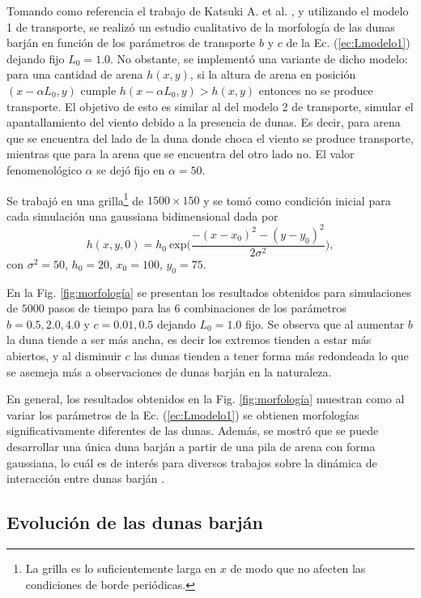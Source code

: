 \documentclass[11pt,twocolumn,twoside]{opticajnl}
\begin{document}
Tomando como referencia el trabajo de Katsuki A. et al. \cite{katsuki_cellular_2011}, y utilizando el modelo 1 de transporte, se realizó un estudio cualitativo de la morfología de las dunas barján en función de los parámetros de transporte $b$ y $c$ de la Ec. (\ref{ec:Lmodelo1}) dejando fijo $L_0=1.0$. No obstante, se implementó una variante de dicho modelo: para una cantidad de arena $h(x,y)$, si la altura de arena en posición $(x-\alpha L_0, y)$ cumple $h(x-\alpha L_0, y) > h(x,y)$ entonces no se produce transporte. El objetivo de esto es similar al del modelo 2 de transporte, simular el apantallamiento del viento debido a la presencia de dunas. Es decir, para arena que se encuentra del lado de la duna donde choca el viento se produce transporte, mientras que para la arena que se encuentra del otro lado no. El valor fenomenológico $\alpha$ se dejó fijo en $\alpha =50$.

Se trabajó en una grilla\footnote{La grilla es lo suficientemente larga en $x$ de modo que no afecten las condiciones de borde periódicas.} de $1500\times150$ y se tomó como condición inicial para cada simulación una gaussiana bidimensional dada por 
\begin{equation}
    h(x,y,0) = h_0 ~ \text{exp} \biggr( \frac{-(x-x_0)^2 - (y-y_0)^2}{2 \sigma^2} \biggr),
    \label{ec:gaussiana}
\end{equation}
con $\sigma^2=50$, $h_0 = 20$, $x_0=100$, $y_0=75$.  

En la Fig. \ref{fig:morfología} se presentan los resultados obtenidos para simulaciones de $5000$ pasos de tiempo para las 6 combinaciones de los parámetros $b=0.5,2.0,4.0$ y $c=0.01,0.5$ dejando $L_0=1.0$ fijo. Se observa que al aumentar $b$ la duna tiende a ser más ancha, es decir los extremos tienden a estar más abiertos, y al disminuir $c$ las dunas tienden a tener forma más redondeada lo que se asemeja más a observaciones de dunas barján en la naturaleza.  

En general, los resultados obtenidos en la Fig. \ref{fig:morfología} muestran como al variar los parámetros de la Ec. (\ref{ec:Lmodelo1}) se obtienen morfologías significativamente diferentes de las dunas. Además, se mostró que se puede desarrollar una única duna barján a partir de una pila de arena con forma gaussiana, lo cuál es de interés para diversos trabajos sobre la dinámica de interacción entre dunas barján \cite{katsuki_cellular_2011} \cite{katsuki_simulation_2011} \cite{katsuki_collision_2005}. 

\subsection{Evolución de las dunas barján}
\end{document}

